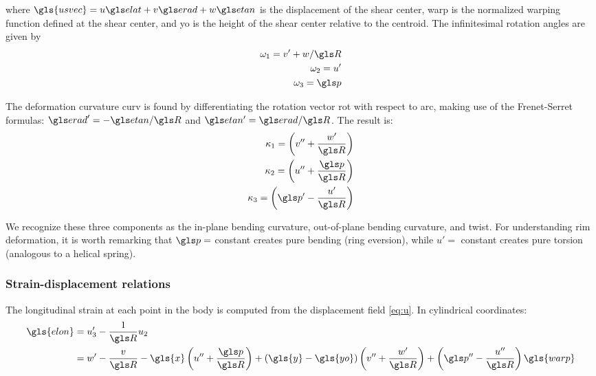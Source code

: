 \documentclass[\rootdir/thesis.tex]{subfiles}
\begin{document}
where $\gls{usvec} = u\eo + v\et + w\eh$ is the displacement of the shear center, \gls{warp} is the normalized warping function defined at the shear center, and \gls{yo} is the height of the shear center relative to the centroid. The infinitesimal rotation angles are given by
\begin{subequations}
\label{eq:omega}
\begin{align}
\omega_1 = v' + w/\R\\
\omega_2 = u'\\
\omega_3 = \p
\end{align}
\end{subequations}

The deformation curvature \gls{curv} is found by differentiating the rotation vector \gls{rot} with respect to \gls{arc}, making use of the Frenet-Serret formulas: $\et' = -\eh/\R$ and $\eh' = \et/\R$. The result is:
\begin{subequations}
\label{eq:kappa}
\begin{align}
\kappa_1 = \left( v'' + \frac{w'}{\R} \right) \label{eq:kappa1}\\
\kappa_2 = \left( u'' + \frac{\p}{\R} \right) \label{eq:kappa2}\\
\kappa_3 = \left( \p' - \frac{u'}{\R} \right) \label{eq:kappa3}
\end{align}
\end{subequations}

We recognize these three components as the in-plane bending curvature, out-of-plane bending curvature, and twist. For understanding rim deformation, it is worth remarking that $\p=$ constant creates pure bending (ring eversion), while $u'=$ constant creates pure torsion (analogous to a helical spring).

\subsubsection{Strain-displacement relations}

The longitudinal strain at each point in the body is computed from the displacement field \eqref{eq:u}. In cylindrical coordinates:
\begin{align}
\label{eq:strain}
\begin{split}
\gls{elon} &= u_3' - \frac{1}{\R} u_2\\
           &= w' - \frac{v}{\R} - \gls{x}\left(u'' + \frac{\p}{\R}\right) +
                 	(\gls{y}-\gls{yo})\left(v'' + \frac{w'}{\R}\right) +
                 	\left(\p'' - \frac{u''}{\R}\right)\gls{warp}
\end{split}
\end{align}
\end{document}
